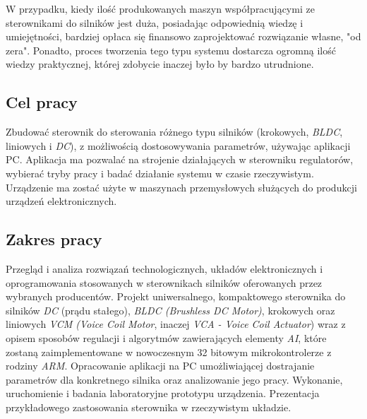 W przypadku, kiedy ilość produkowanych maszyn współpracującymi ze sterownikami do silników jest duża, posiadając odpowiednią wiedzę i umiejętności, bardziej opłaca się finansowo zaprojektować rozwiązanie własne, "od zera". Ponadto, proces tworzenia tego typu systemu dostarcza ogromną ilość wiedzy praktycznej, której zdobycie inaczej było by bardzo utrudnione.
  
\subsection*{Cel pracy}
Zbudować sterownik do sterowania różnego typu silników (krokowych, {\it BLDC}, liniowych i {\it DC}), z możliwością dostosowywania parametrów, używając aplikacji PC. Aplikacja ma pozwalać na strojenie działających w sterowniku regulatorów, wybierać tryby pracy i badać działanie systemu w czasie rzeczywistym. Urządzenie ma zostać użyte w maszynach przemysłowych służących do produkcji urządzeń elektronicznych.

\subsection*{Zakres pracy}
Przegląd i analiza rozwiązań technologicznych, układów elektronicznych i oprogramowania stosowanych w sterownikach silników oferowanych przez wybranych producentów. Projekt uniwersalnego, kompaktowego sterownika do silników {\it DC} (prądu stałego), {\it BLDC (Brushless DC Motor)}, krokowych oraz liniowych {\it VCM (Voice Coil Motor}, inaczej {\it VCA - Voice Coil Actuator}) wraz z opisem sposobów regulacji i algorytmów zawierających elementy {\it AI}, które zostaną zaimplementowane w nowoczesnym 32 bitowym mikrokontrolerze z rodziny {\it ARM}. Opracowanie aplikacji na PC umożliwiającej dostrajanie parametrów dla konkretnego silnika oraz analizowanie jego pracy. Wykonanie, uruchomienie i badania laboratoryjne prototypu urządzenia. Prezentacja przykładowego zastosowania sterownika w rzeczywistym układzie.

\clearpage
